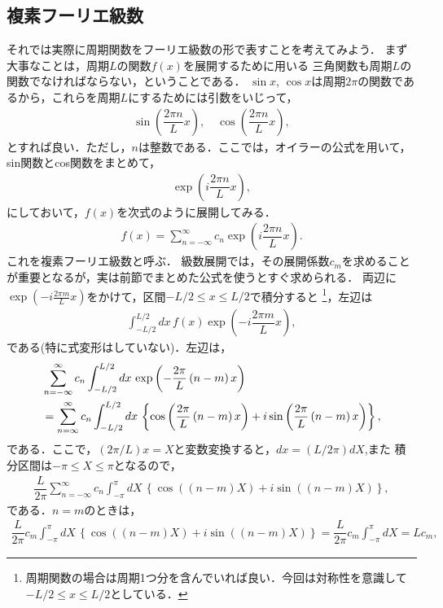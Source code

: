 \subsection{複素フーリエ級数}
%
それでは実際に周期関数をフーリエ級数の形で表すことを考えてみよう．
まず大事なことは，周期$L$の関数$f\left(x\right)$を展開するために用いる
三角関数も周期$L$の関数でなければならない，ということである．
$\sin x$, $\cos x$は周期$2\pi$の関数であるから，これらを周期$L$にするためには引数をいじって，
\begin{align}
  \sin\left(\dfrac{2\pi n}{L}x\right),\quad \cos\left(\dfrac{2\pi n}{L}x\right),
\end{align}
とすれば良い．ただし，$n$は整数である．ここでは，オイラーの公式を用いて，sin関数とcos関数をまとめて，
\begin{align}
 \exp\left(i\dfrac{2\pi n}{L}x\right),
\end{align}
にしておいて，$f\left(x\right)$を次式のように展開してみる．
\begin{align}
 f\left(x\right) = \sum_{n=-\infty}^{\infty} c_{n} \exp\left(i\dfrac{2\pi n}{L}x\right). 
\end{align}
これを複素フーリエ級数と呼ぶ．
級数展開では，その展開係数$c_m$を求めることが重要となるが，実は前節でまとめた公式を使うとすぐ求められる．
両辺に$\exp(-i\frac{2\pi m}{L}x)$をかけて，区間$-L/2 \leq x \leq L/2$で積分すると
\footnote{周期関数の場合は周期1つ分を含んでいれば良い．今回は対称性を意識して$-L/2 \leq x \leq L/2$としている．}，左辺は
\begin{align}
\int_{-L/2}^{L/2}dx\,f\left(x\right)\exp\left(-i\dfrac{2\pi m}{L}x\right),
\end{align}
である(特に式変形はしていない)．左辺は，
\begin{align}
 &\sum_{n=-\infty}^{\infty}c_n\int_{-L/2}^{L/2}dx\,\exp\left(-\dfrac{2\pi}{L}\left(n-m\right)x\right) \notag \\
 &=\sum_{n=\infty}^{\infty}c_n\int_{-L/2}^{L/2}dx\,\left\{\cos\left(\dfrac{2\pi}{L}\left(n-m\right)x\right) 
   + i\sin\left(\dfrac{2\pi}{L}\left(n-m\right)x\right)\right\},
\end{align}
である．ここで，$(2\pi/L)x = X$と変数変換すると，$dx = (L/2\pi)dX$,また 
積分区間は$-\pi\leq X \leq \pi$となるので，
\begin{align}
  \dfrac{L}{2\pi}  \sum_{n=-\infty}^{\infty} c_n \int_{-\pi}^{\pi}dX\, \left\{\cos\left(\left(n-m\right)X\right) + i\sin\left(\left(n-m\right)X\right)\right\},
\end{align}
である．$n=m$のときは，
\begin{align}
 \dfrac{L}{2\pi}  c_m \int_{-\pi}^{\pi}dX\, \left\{\cos\left(\left(n-m\right)X\right) + i\sin\left(\left(n-m\right)X\right)\right\} = \dfrac{L}{2\pi}c_{m}\int_{-\pi}^{\pi}dX = Lc_{m},
\end{align}
